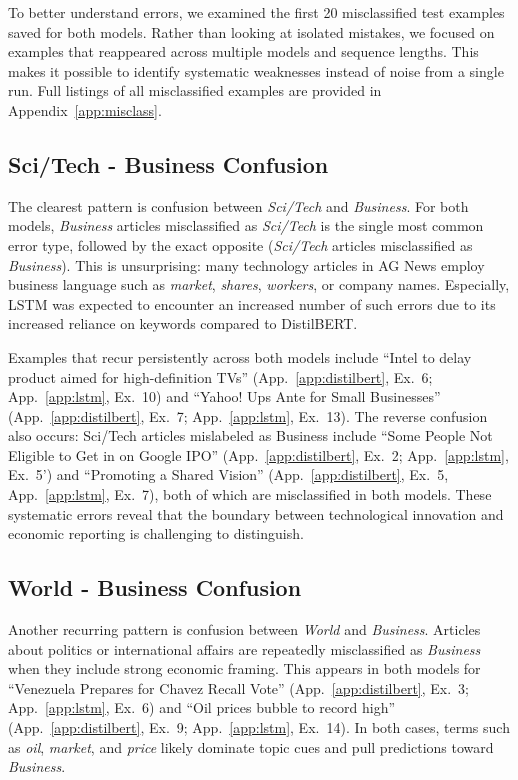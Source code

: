 To better understand errors, we examined the first 20 misclassified test examples saved for both models. Rather than looking at isolated mistakes, we focused on examples that reappeared across multiple models and sequence lengths. This makes it possible to identify systematic weaknesses instead of noise from a single run. Full listings of all misclassified examples are provided in Appendix~\ref{app:misclass}.

\subsection{Sci/Tech - Business Confusion}

The clearest pattern is confusion between \textit{Sci/Tech} and \textit{Business}. For both models, \textit{Business} articles misclassified as \textit{Sci/Tech} is the single most common error type, followed by the exact opposite (\textit{Sci/Tech} articles misclassified as \textit{Business}). This is unsurprising: many technology articles in AG News employ business language such as \textit{market}, \textit{shares}, \textit{workers}, or company names. Especially, LSTM was expected to encounter an increased number of such errors due to its increased reliance on keywords compared to DistilBERT. 

Examples that recur persistently across both models include ``Intel to delay product aimed for high-definition TVs'' (App.~\ref{app:distilbert}, Ex.~6; App.~\ref{app:lstm}, Ex.~10) and ``Yahoo! Ups Ante for Small Businesses'' (App.~\ref{app:distilbert}, Ex.~7; App.~\ref{app:lstm}, Ex.~13). The reverse confusion also occurs: Sci/Tech articles mislabeled as Business include ``Some People Not Eligible to Get in on Google IPO'' (App.~\ref{app:distilbert}, Ex.~2; App.~\ref{app:lstm}, Ex.~5') and ``Promoting a Shared Vision'' (App.~\ref{app:distilbert}, Ex.~5, App.~\ref{app:lstm}, Ex.~7), both of which are misclassified in both models. These systematic errors reveal that the boundary between technological innovation and economic reporting is challenging to distinguish.

\subsection{World - Business Confusion}

Another recurring pattern is confusion between \textit{World} and \textit{Business}. Articles about politics or international affairs are repeatedly misclassified as \textit{Business} when they include strong economic framing. This appears in both models for ``Venezuela Prepares for Chavez Recall Vote'' (App.~\ref{app:distilbert}, Ex.~3; App.~\ref{app:lstm}, Ex.~6) and ``Oil prices bubble to record high'' (App.~\ref{app:distilbert}, Ex.~9; App.~\ref{app:lstm}, Ex.~14). In both cases, terms such as \textit{oil}, \textit{market}, and \textit{price} likely dominate topic cues and pull predictions toward \textit{Business}.

